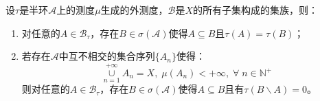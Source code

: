 \begin{theorem}\label{theo:DifOfFtauAndSigmaA}
	设$\tau$是半环$\mathscr{A}$上的测度$\mu$生成的外测度，$\mathscr{B}$是$X$的所有子集构成的集族，则：
	\begin{enumerate}
		\item 对任意的$A\in\mathscr{B}_\tau$，存在$B\in\sigma(\mathscr{A})$使得$A\subseteq B$且$\tau(A)=\tau(B)$；
		\item 若存在$\mathscr{A}$中互不相交的集合序列$\{A_n\}$使得：
		\begin{equation*}
			\underset{n=1}{\overset{+\infty}{\cup}}A_n=X,\;\mu(A_n)<+\infty,\;\forall\;n\in\mathbb{N}^+
		\end{equation*}
		则对任意的$A\in\mathscr{B}_\tau$，存在$B\in\sigma(\mathscr{A})$使得$A\subseteq B$且有$\tau(B\backslash A)=0$。
	\end{enumerate}
\end{theorem}
